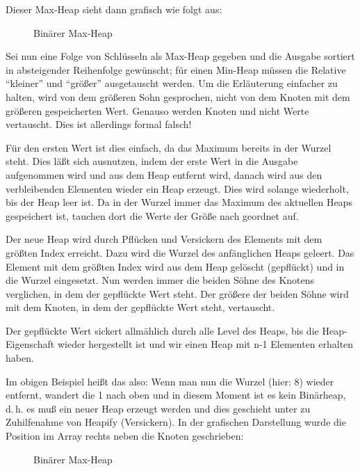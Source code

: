 \documentclass[ngerman,draft,parskip=half*,twoside]{scrreprt}
\theoremstyle{break}
\theoremstyle{nonumberbreak}
\begin{document}
Dieser Max-Heap sieht dann grafisch wie folgt aus:

\begin{figure}[H]
	\centering
	\caption{Binärer Max-Heap}
	\label{101103c}
\end{figure}

Sei nun eine Folge von Schlüsseln als Max-Heap gegeben und die Ausgabe sortiert in absteigender Reihenfolge gewünscht; für einen
Min-Heap müssen die Relative "`kleiner"' und "`größer"' ausgetauscht werden. Um die Erläuterung einfacher zu halten, wird von dem
größeren Sohn gesprochen, nicht von dem Knoten mit dem größeren gespeicherten Wert. Genauso werden Knoten und nicht Werte vertauscht.
Dies ist allerdings formal falsch!

Für den ersten Wert ist dies einfach, da das Maximum bereits in der Wurzel steht.
Dies läßt sich ausnutzen, indem der erste Wert in die Ausgabe aufgenommen wird und aus dem Heap entfernt wird, danach wird aus den
verbleibenden Elementen wieder ein Heap erzeugt. Dies wird solange wiederholt, bis der Heap leer ist. Da in der Wurzel immer das Maximum
des aktuellen Heaps gespeichert ist, tauchen dort die Werte der Größe nach geordnet auf.

Der neue Heap wird durch Pflücken und Versickern des Elements mit dem größten Index erreicht. Dazu wird die Wurzel des anfänglichen Heaps geleert. Das Element mit dem größten Index wird aus dem Heap gelöscht
(gepflückt) und in die Wurzel eingesetzt.
Nun werden immer die beiden Söhne des Knotens verglichen, in dem der gepflückte Wert steht. Der größere der beiden Söhne wird mit
dem Knoten, in dem der gepflückte Wert steht, vertauscht.

Der gepflückte Wert sickert allmählich durch alle Level des Heaps, bis die
Heap-Eigenschaft wieder hergestellt ist und wir einen Heap mit n-1 Elementen erhalten haben.

Im obigen Beispiel heißt das also:
Wenn man nun die Wurzel (hier: 8) wieder entfernt, wandert die 1 nach
oben und in diesem Moment ist es kein Binärheap, d.\,h. es muß
ein neuer Heap erzeugt werden und dies geschieht unter zu Zuhilfenahme von Heapify (Versickern).
In der grafischen Darstellung wurde die Position im Array rechts neben die Knoten geschrieben:
\begin{figure}[H]
	\centering \hspace{2cm}
	\caption{Binärer Max-Heap}
	\label{101103de}
\end{figure}
\end{document}
